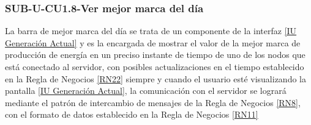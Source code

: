 \subsubsection{SUB-U-CU1.8-Ver mejor marca del día}\label{SUB-U-CU1.8}
La barra de mejor marca del día se trata de un componente de la interfaz \hyperref[fig:monitoreoReal]{[IU Generación Actual]} y es la encargada de mostrar el valor de la mejor marca de producción de energía en un preciso instante de tiempo de uno de los nodos que está conectado al servidor, con posibles actualizaciones en el tiempo establecido en la Regla de Negocios \ref{RN22} siempre y cuando el usuario esté visualizando la pantalla \hyperref[fig:monitoreoReal]{[IU Generación Actual]}, la comunicación con el servidor se logrará mediante el patrón de intercambio de mensajes de la Regla de Negocios \ref{RN8}, con el formato de datos establecido en la Regla de Negocios \ref{RN11}   
